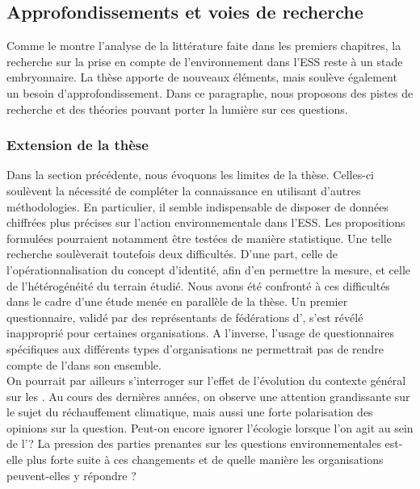     \subsection{Approfondissements et voies de recherche}
        Comme le montre l'analyse de la littérature faite dans les premiers chapitres, la recherche sur la prise en compte de l'environnement dans l'ESS reste à un stade embryonnaire. La thèse apporte de nouveaux éléments, mais soulève également un besoin d'approfondissement. Dans ce paragraphe, nous proposons des pistes de recherche et des théories pouvant porter la lumière sur ces questions.

        \subsubsection{Extension de la thèse}
            Dans la section précédente, nous évoquons les limites de la thèse. Celles-ci soulèvent la nécessité de compléter la connaissance en utilisant d'autres méthodologies. En particulier, il semble indispensable de disposer de données chiffrées plus précises sur l'action environnementale dans l'ESS. Les propositions formulées pourraient notamment être testées de manière statistique. Une telle recherche soulèverait toutefois deux difficultés. D'une part, celle de l'opérationnalisation du concept d'identité, afin d'en permettre la mesure, et celle de l'hétérogénéité du terrain étudié. Nous avons été confronté à ces difficultés dans le cadre d'une étude menée en parallèle de la thèse. Un premier questionnaire, validé par des représentants de fédérations d'\oess, s'est révélé inapproprié pour certaines organisations. A l'inverse, l'usage de questionnaires spécifiques aux différents types d'organisations ne permettrait pas de rendre compte de l'\ess dans son ensemble. \\

            On pourrait par ailleurs s'interroger sur l'effet de l'évolution du contexte général sur les \oess. Au cours des dernières années, on observe une attention grandissante sur le sujet du réchauffement climatique, mais aussi une forte polarisation des opinions sur la question. Peut-on encore ignorer l'écologie lorsque l'on agit au sein de l'\ess ? La pression des parties prenantes sur les questions environnementales est-elle plus forte suite à ces changements et de quelle manière les organisations peuvent-elles y répondre ?  \\

